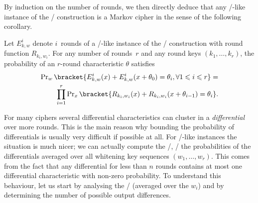 By induction on the number of rounds, we then directly deduce that any \bison/-like instance of the \WSN/ construction is a Markov cipher in the sense of the following corollary.
\begin{corollary}\label{bison:coro:Markov}
    Let $E_{k,w}^i$ denote $i$~rounds of a \bison/-like instance of the \WSN/ construction with round function $R_{k_i,w_i}$.
    For any number of rounds~$r$ and any round keys $(k_1, \ldots, k_r)$, the probability of an $r$-round characteristic $\theta$ satisfies
    \begin{equation*}
        \begin{split}
            \Prob_{w}\bracket{E^i_{k,w}(x) + E^i_{k,w}(x+\theta_0)=\theta_i, \forall 1 \leqslant i \leqslant r} = \\
            \quad \prod_{i=1}^r \Prob_{x} \bracket{R_{k_i,w_i}(x) + R_{k_i,w_i}(x+\theta_{i-1}) = \theta_i}.
        \end{split}
    \end{equation*}
\end{corollary}

For many ciphers several differential characteristics can cluster in a \emph{differential} over more rounds.
This is the main reason why bounding the probability of differentials is usually very difficult if possible at all.
For \bison/-like instances the situation is much nicer; we can actually compute the \EDP/, \ie/ the probabilities of the differentials averaged over all whitening key sequences $(w_1, \ldots, w_r)$.
This comes from the fact that any differential for less than $n$ rounds contains at most one differential characteristic with non-zero probability.
To understand this behaviour, let us start by analysing the \EDP/ (averaged over the $w_i$) and by determining the number of possible output differences.

